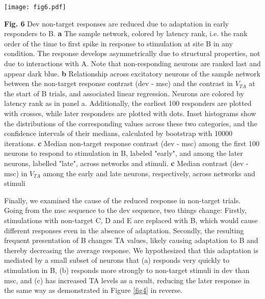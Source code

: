 \documentclass[pdflatex,referee,iicol,sn-basic]{sn-jnl}
\theoremstyle{thmstyleone}%
\theoremstyle{thmstyletwo}%
\theoremstyle{thmstylethree}%
\begin{document}
\begin{figure*}%
    \centering
    \texttt{[image: fig6.pdf]}
    \caption{}
    \label{fig6}
\end{figure*}
\textbf{Fig. 6} Dev non-target responses are reduced due to adaptation in early responders to B.
\textbf{a} The sample network, colored by latency rank, i.e. the rank order of the time to first spike in response to stimulation at site B in any condition. The response develops asymmetrically due to structural properties, not due to interactions with A. Note that non-responding neurons are ranked last and appear dark blue.
\textbf{b} Relationship across excitatory neurons of the sample network between the non-target response contrast (dev - msc) and the contrast in $V_{TA}$ at the start of B trials, and associated linear regression. Neurons are colored by latency rank as in panel a. Additionally, the earliest 100 responders are plotted with crosses, while later responders are plotted with dots. Inset histograms show the distributions of the corresponding values across these two categories, and the confidence intervals of their medians, calculated by bootstrap with 10000 iterations.
\textbf{c} Median non-target response contrast (dev - msc) among the first 100 neurons to respond to stimulation in B, labeled "early", and among the later neurons, labelled "late", across networks and stimuli.
\textbf{c} Median contrast (dev - msc) in $V_{TA}$ among the early and late neurons, respectively, across networks and stimuli

Finally, we examined the cause of the reduced response in non-target trials. Going from the msc sequence to the dev sequence, two things change: Firstly, stimulations with non-target C, D and E are replaced with B, which would cause different responses even in the absence of adaptation. Secondly, the resulting  frequent presentation of B changes TA values, likely causing adaptation to B and thereby decreasing the average response. We hypothesized that this adaptation is mediated by a small subset of neurons that (a) responds very quickly to stimulation in B, (b) responds more strongly to non-target stimuli in dev than msc, and (c) has increased TA levels as a result, reducing the later response in the same way as demonstrated in Figure \ref{fig4} in reverse.
\end{document}
